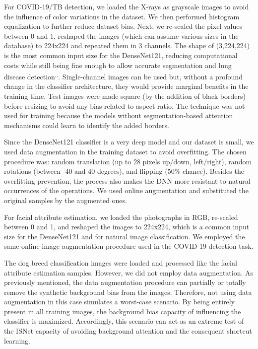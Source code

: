 \documentclass[fleqn,10pt]{wlscirep}
\begin{document}
{For COVID-19/TB detection, we loaded the X-rays as grayscale images to avoid the influence of color variations in the dataset. We then performed histogram equalization to further reduce dataset bias. Next, we re-scaled the pixel values between 0 and 1, reshaped the images (which can assume various sizes in the database) to 224x224 and repeated them in 3 channels. The shape of (3,224,224) is the most common input size for the DenseNet121, reducing computational costs while still being fine enough to allow accurate segmentation and lung disease detection\cite{bassi2021covid19}\textsuperscript{,}\cite{chexnet}\textsuperscript{,}\cite{bassiCovid}. Single-channel images can be used but, without a profound change in the classifier architecture, they would provide marginal benefits in the training time. Test images were made square (by the addition of black borders) before resizing to avoid any bias related to aspect ratio. The technique was not used for training because the models without segmentation-based attention mechanisms could learn to identify the added borders.

Since the DenseNet121 classifier is a very deep model and our dataset is small, we used data augmentation in the training dataset to avoid overfitting. The chosen procedure was: random translation (up to 28 pixels up/down, left/right), random rotations (between -40 and 40 degrees), and flipping (50\% chance). Besides the overfitting prevention, the process also makes the DNN more resistant to natural occurrences of the operations. We used online augmentation and substituted the original samples by the augmented ones. 

For facial attribute estimation, we loaded the photographs in RGB, re-scaled between 0 and 1, and reshaped the images to 224x224, which is a common input size for the DenseNet121 and for natural image classification. We employed the same online image augmentation procedure used in the COVID-19 detection task.

The dog breed classification images were loaded and processed like the facial attribute estimation samples. However, we did not employ data augmentation. As previously mentioned, the data augmentation procedure can partially or totally remove the synthetic background bias from the images. Therefore, not using data augmentation in this case simulates a worst-case scenario. By being entirely present in all training images, the background bias capacity of influencing the classifier is maximized. Accordingly, this scenario can act as an extreme test of the ISNet capacity of avoiding background attention and the consequent shortcut learning.

}
\end{document}
